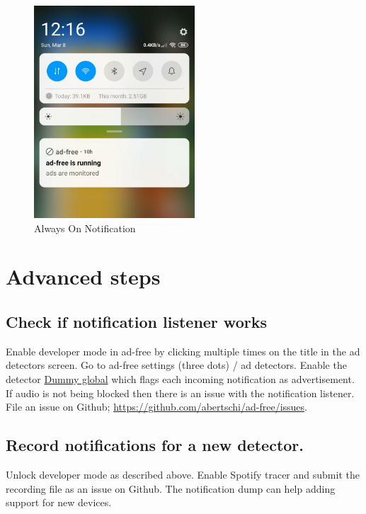 \documentclass[11pt]{article}
\begin{document}
\begin{figure}[htbp]
\centering
\includegraphics[height=300px]{./res/notification-always-on.jpg}
\caption{Always On Notification}
\end{figure}


\section{Advanced steps}
\label{sec:org289b971}
\subsection{Check if notification listener works}
\label{sec:org4d6e82a}
Enable developer mode in ad-free by clicking multiple times on the
title in the ad detectors screen. Go to ad-free settings (three dots)
/ ad detectors. Enable the detector \uline{Dummy global} which flags each
incoming notification as advertisement. If audio is not being blocked
then there is an issue with the notification listener. File an issue
on Github; \url{https://github.com/abertschi/ad-free/issues}.

\subsection{Record notifications for a new detector.}
\label{sec:orgb9fe325}
Unlock developer mode as described above. Enable Spotify tracer and
submit the recording file as an issue on Github. The notification dump
can help adding support for new devices.
\end{document}
